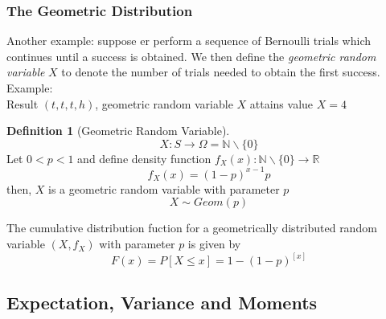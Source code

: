 \documentclass{article}
\theoremstyle{definition}
\newtheorem{definition}{Definition}[subsection]
\begin{document}
\subsubsection{The Geometric Distribution}
Another example: suppose er perform a sequence of Bernoulli trials which continues until a success is obtained. We then define the \emph{geometric random variable} $ X $ to denote the number of trials needed to obtain the first success.\\
Example:\\
Result $ (t,t,t,h) $, geometric random variable $ X $ attains value $ X=4 $
\begin{definition}[Geometric Random Variable]
    \begin{equation}
        X:S\rightarrow \Omega = \mathbb{N}\backslash \{0\}
    \end{equation}
    Let $ 0<p<1 $ and define density function $ f_X(x):\mathbb{N}\backslash\{0\} \rightarrow\mathbb{R} $
    \begin{equation}
        f_X(x)=(1-p)^{x-1}p
    \end{equation}
    then, $ X $ is a geometric random variable with parameter $ p $ 
    \begin{equation}
        X \sim Geom(p)
    \end{equation}
\end{definition}
The cumulative distribution fuction for a geometrically distributed random variable $ (X,f_X) $ with parameter $ p $ is given by
\begin{equation}
    F(x)=P[X\leq x] = 1-(1-p)^{[x]}
\end{equation}
\subsection{Expectation, Variance and Moments}
\end{document}
